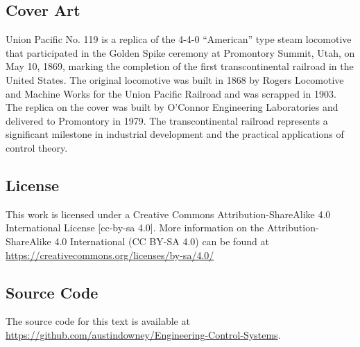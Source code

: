 \documentclass[12pt,letter]{article}
\begin{document}
\subsection*{Cover Art}
Union Pacific No. 119 is a replica of the 4-4-0 ``American'' type steam locomotive that participated in the Golden Spike ceremony at Promontory Summit, Utah, on May 10, 1869, marking the completion of the first transcontinental railroad in the United States. The original locomotive was built in 1868 by Rogers Locomotive and Machine Works for the Union Pacific Railroad and was scrapped in 1903. The replica on the cover was built by O'Connor Engineering Laboratories and delivered to Promontory in 1979. The  transcontinental railroad represents a significant milestone in industrial development and the practical applications of control theory.

\subsection*{License}
This work is licensed under a Creative Commons Attribution-ShareAlike 4.0 International License [cc-by-sa 4.0]. More information on the Attribution-ShareAlike 4.0 International (CC BY-SA 4.0) can be found at  \url{https://creativecommons.org/licenses/by-sa/4.0/}

\subsection*{Source Code}
The source code for this text is available at \url{https://github.com/austindowney/Engineering-Control-Systems}.


\pagebreak

\tableofcontents

\pagebreak

\graphicspath{{Chapter_1_Basic_Concepts/}}











\end{document}
